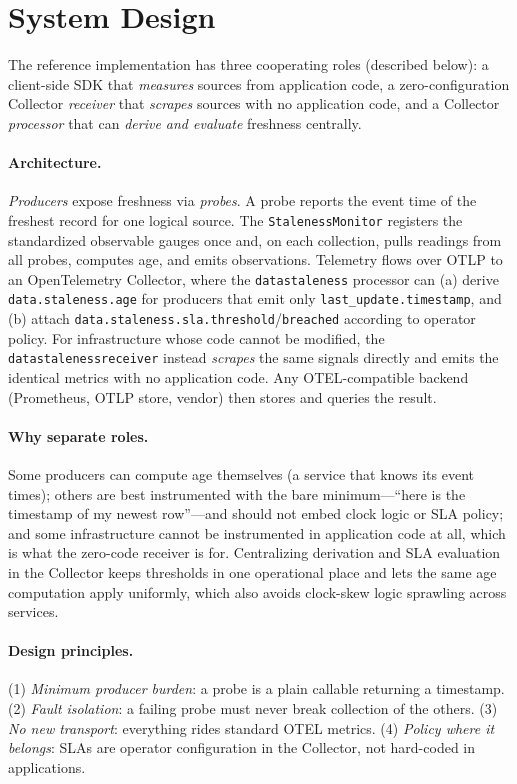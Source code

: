 \documentclass[11pt]{article}
\begin{document}
\section{System Design}
\label{sec:design}
The reference implementation has three cooperating roles
(described below): a client-side SDK that \emph{measures} sources from
application code, a zero-configuration Collector \emph{receiver} that
\emph{scrapes} sources with no application code, and a Collector \emph{processor}
that can \emph{derive and evaluate} freshness centrally.

\paragraph{Architecture.}
\textit{Producers} expose freshness via \emph{probes}. A probe reports the event
time of the freshest record for one logical source. The \texttt{StalenessMonitor}
registers the standardized observable gauges once and, on each collection,
pulls readings from all probes, computes age, and emits observations. Telemetry
flows over OTLP to an OpenTelemetry Collector, where the \texttt{datastaleness}
processor can (a) derive \texttt{data.staleness.age} for producers that emit
only \texttt{last\_update.timestamp}, and (b) attach
\texttt{data.staleness.sla.threshold}/\texttt{breached} according to operator
policy. For infrastructure whose code cannot be modified, the
\texttt{datastalenessreceiver} instead \emph{scrapes} the same signals directly
and emits the identical metrics with no application code. Any OTEL-compatible
backend (Prometheus, OTLP store, vendor) then stores and queries the result.

\paragraph{Why separate roles.}
Some producers can compute age themselves (a service that knows its event
times); others are best instrumented with the bare minimum---``here is the
timestamp of my newest row''---and should not embed clock logic or SLA policy;
and some infrastructure cannot be instrumented in application code at all, which
is what the zero-code receiver is for.
Centralizing derivation and SLA evaluation in the Collector keeps thresholds in
one operational place and lets the same age computation apply uniformly, which
also avoids clock-skew logic sprawling across services.

\paragraph{Design principles.}
(1) \emph{Minimum producer burden}: a probe is a plain callable returning a
timestamp. (2) \emph{Fault isolation}: a failing probe must never break
collection of the others. (3) \emph{No new transport}: everything rides
standard OTEL metrics. (4) \emph{Policy where it belongs}: SLAs are operator
configuration in the Collector, not hard-coded in applications.
\end{document}
